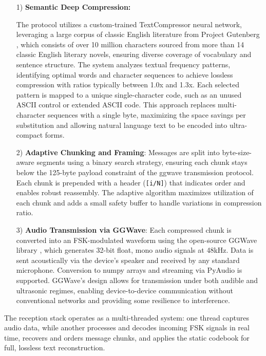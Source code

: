 \documentclass[12pt,openany]{article}
\theoremstyle{definition}
\theoremstyle{definition}
\theoremstyle{definition}
\begin{document}
\begin{enumerate}

\item[1)] \textbf{Semantic Deep Compression:}

The protocol utilizes a custom-trained TextCompressor neural network, leveraging a large corpus of classic English literature from Project Gutenberg \cite{projectgutenberg}, which consists of over 10 million characters sourced from more than 14 classic English literary novels, ensuring diverse coverage of vocabulary and sentence structure. The system analyzes textual frequency patterns, identifying optimal words and character sequences to achieve lossless compression with ratios typically between 1.0x and 1.3x. Each selected pattern is mapped to a unique single-character code, such as an unused ASCII control or extended ASCII code. This approach replaces multi-character sequences with a single byte, maximizing the space savings per substitution and allowing natural language text to be encoded into ultra-compact forms.

\item [2)]\textbf{Adaptive Chunking and Framing}:  
Messages are split into byte-size-aware segments using a binary search strategy, ensuring each chunk stays below the 125-byte payload constraint of the ggwave transmission protocol. Each chunk is prepended with a header (\texttt{[i/N]}) that indicates order and enables robust reassembly. The adaptive algorithm maximizes utilization of each chunk and adds a small safety buffer to handle variations in compression ratio.

\item[3)] \textbf{Audio Transmission via GGWave}:  
Each compressed chunk is converted into an FSK-modulated waveform using the open-source GGWave library \cite{ggwave}, which generates 32-bit float, mono audio signals at 48kHz. Data is sent acoustically via the device's speaker and received by any standard microphone. Conversion to numpy arrays \cite{harris2020array} and streaming via PyAudio \cite{pyaudio} is supported. GGWave's design allows for transmission under both audible and ultrasonic regimes, enabling device-to-device communication without conventional networks and providing some resilience to interference.
\end{enumerate}
The reception stack operates as a multi-threaded system: one thread captures audio data, while another processes and decodes incoming FSK signals in real time, recovers and orders message chunks, and applies the static codebook for full, lossless text reconstruction.
\end{document}
